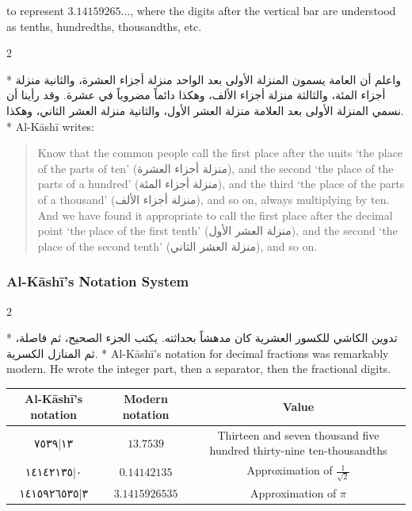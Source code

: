 \documentclass[11pt,a4paper]{article}
\newcommand{\ar}[1]{\arabicfont\beginR #1\endR}
\newenvironment{bilingual}{%
  \vspace{0.3em}%
  \begin{paracol}{2}%
}{%
  \end{paracol}%
  \vspace{0.3em}%
}
\begin{document}
\begin{center}
\end{center}

\noindent to represent $3.14159265\ldots$, where the digits after the
vertical bar are understood as tenths, hundredths, thousandths, etc.

\begin{bilingual}
\switchcolumn[0]*
\ar{واعلم أن العامة يسمون المنزلة الأولى بعد الواحد منزلة أجزاء العشرة، والثانية منزلة أجزاء المئة، والثالثة منزلة أجزاء الألف، وهكذا دائماً مضروباً في عشرة. وقد رأينا أن نسمي المنزلة الأولى بعد العلامة منزلة العشر الأول، والثانية منزلة العشر الثاني، وهكذا.}
\switchcolumn[1]*
Al-K\=ash\=i writes:

\begin{quote}
Know that the common people call the first place after the units `the
place of the parts of ten' (\ar{منزلة أجزاء العشرة}), and the second
`the place of the parts of a hundred' (\ar{منزلة أجزاء المئة}), and
the third `the place of the parts of a thousand'
(\ar{منزلة أجزاء الألف}), and so on, always multiplying by ten. And
we have found it appropriate to call the first place after the decimal
point `the place of the first tenth' (\ar{منزلة العشر الأول}), and
the second `the place of the second tenth'
(\ar{منزلة العشر الثاني}), and so on.
\end{quote}
\end{bilingual}

\subsubsection{Al-K\=ash\=i's Notation System}

\begin{bilingual}
\switchcolumn[0]*
\ar{تدوين الكاشي للكسور العشرية كان مدهشاً بحداثته. يكتب الجزء الصحيح، ثم فاصلة، ثم المنازل الكسرية.}
\switchcolumn[1]*
Al-K\=ash\=i's notation for decimal fractions was remarkably modern. He
wrote the integer part, then a separator, then the fractional digits.
\end{bilingual}

\begin{center}
\begin{tabular}{|c|c|c|}
\hline
\textbf{Al-K\=ash\=i's notation} & \textbf{Modern notation} & \textbf{Value} \\
\hline
\ar{١٣|٧٥٣٩} & $13.7539$ & Thirteen and seven thousand five
hundred thirty-nine ten-thousandths \\
\hline
\ar{٠|١٤١٤٢١٣٥} & $0.14142135$ & Approximation of
$\frac{1}{\sqrt{2}}$ \\
\hline
\ar{٣|١٤١٥٩٢٦٥٣٥} & $3.1415926535$ & Approximation of $\pi$ \\
\hline
\end{tabular}
\end{center}
\end{document}

